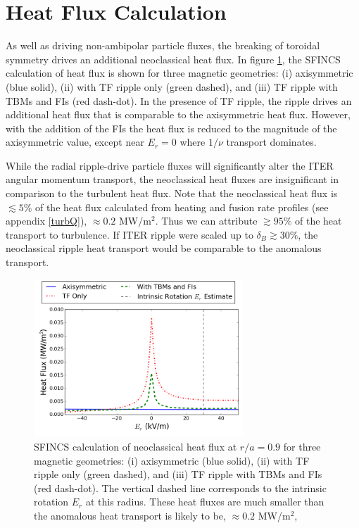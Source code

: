 \documentclass{article}
\numberwithin{figure}{section}
\numberwithin{equation}{section}
\begin{document}
\FloatBarrier

\section{Heat Flux Calculation}\label{heatflux}
As well as driving non-ambipolar particle fluxes, the breaking of toroidal symmetry drives an additional neoclassical heat flux. In figure \ref{fig:HeatFlux}, the SFINCS calculation of heat flux is shown for three magnetic geometries: (i) axisymmetric (blue solid), (ii) with TF ripple only (green dashed), and (iii) TF ripple with TBMs and FIs (red dash-dot). In the presence of TF ripple, the ripple drives an additional heat flux that is comparable to the axisymmetric heat flux. However, with the addition of the FIs the heat flux is reduced to the magnitude of the axisymmetric value, except near $E_r = 0$ where $1/\nu$ transport dominates. 

While the radial ripple-drive particle fluxes will significantly alter the ITER angular momentum transport, the neoclassical heat fluxes are insignificant in comparison to the turbulent heat flux. Note that the neoclassical heat flux is $\lesssim 5\%$  of the heat flux calculated from heating and fusion rate profiles (see appendix \ref{turbQ}), $\approx 0.2$ MW/m$^2$. Thus we can attribute $\gtrsim 95\%$ of the heat transport to turbulence. If ITER ripple were scaled up to $\delta_B \gtrsim 30\%$, the neoclassical ripple heat transport would be comparable to the anomalous transport.

\begin{figure}[h!]
\centering
\includegraphics[width=0.7\textwidth]
{HeatFlux.png}
\caption{\label{fig:HeatFlux} SFINCS calculation of neoclassical heat flux at $r/a = 0.9$ for three magnetic geometries: (i) axisymmetric (blue solid), (ii) with TF ripple only (green dashed), and (iii) TF ripple with TBMs and FIs (red dash-dot). The vertical dashed line corresponds to the intrinsic rotation $E_r$ at this radius. These heat fluxes are much smaller than the anomalous heat transport is likely to be, $\approx 0.2$ MW/m$^2$,}
\end{figure}
\end{document}
